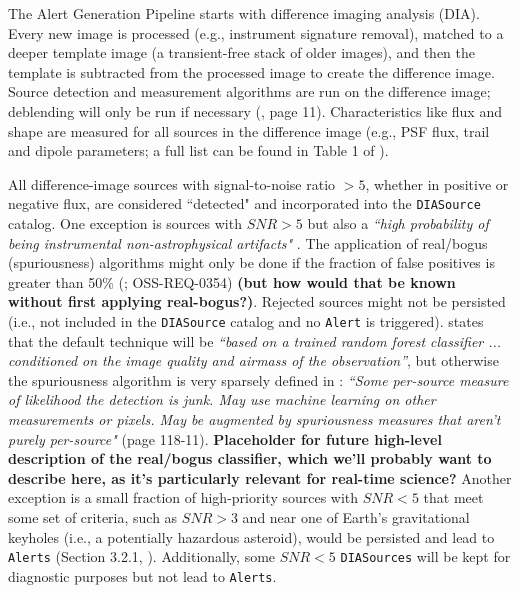 The Alert Generation Pipeline starts with difference imaging analysis (DIA). Every new image is processed (e.g., instrument signature removal), matched to a deeper template image (a transient-free stack of older images), and then the template is subtracted from the processed image to create the difference image. Source detection and measurement algorithms are run on the difference image; deblending will only be run if necessary (, page 11). Characteristics like flux and shape are measured for all sources in the difference image (e.g., PSF flux, trail and dipole parameters; a full list can be found in Table 1 of ). 

All difference-image sources with signal-to-noise ratio $>5$, whether in positive or negative flux, are considered ``detected" and incorporated into the {\tt DIASource} catalog. One exception is sources with $SNR>5$ but also a {\it ``high probability of being instrumental non-astrophysical artifacts"} \cite{LSE-163}. The application of real/bogus (spuriousness) algorithms might only be done if the fraction of false positives is greater than 50\% (; OSS-REQ-0354) {\bf (but how would that be known without first applying real-bogus?)}. Rejected sources might not be persisted (i.e., not included in the {\tt DIASource} catalog and no {\tt Alert} is triggered).  states that the default technique will be {\it ``based on a trained random forest classifier ... conditioned on the image quality and airmass of the observation''}, but otherwise the spuriousness algorithm is very sparsely defined in : {\it ``Some per-source measure of likelihood the detection is junk. May use machine learning on other measurements or pixels. May be augmented by spuriousness measures that aren't purely per-source"} (page 118-11). {\bf Placeholder for future high-level description of the real/bogus classifier, which we'll probably want to describe here, as it's particularly relevant for real-time science?} Another exception is a small fraction of high-priority sources with $SNR<5$ that meet some set of criteria, such as $SNR>3$ and near one of Earth's gravitational keyholes (i.e., a potentially hazardous asteroid), would be persisted and lead to {\tt Alerts} (Section 3.2.1, ). Additionally, some $SNR<5$ {\tt DIASources} will be kept for diagnostic purposes but not lead to {\tt Alerts}.

